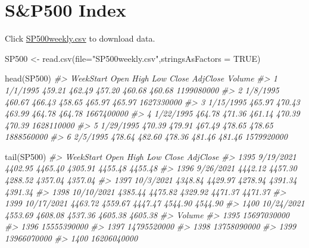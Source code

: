\documentclass[
]{book}
\newenvironment{Shaded}{\begin{snugshade}}{\end{snugshade}}
\newcommand{\AttributeTok}[1]{\textcolor[rgb]{0.77,0.63,0.00}{#1}}
\newcommand{\CommentTok}[1]{\textcolor[rgb]{0.56,0.35,0.01}{\textit{#1}}}
\newcommand{\ConstantTok}[1]{\textcolor[rgb]{0.00,0.00,0.00}{#1}}
\newcommand{\FunctionTok}[1]{\textcolor[rgb]{0.00,0.00,0.00}{#1}}
\newcommand{\NormalTok}[1]{#1}
\newcommand{\OtherTok}[1]{\textcolor[rgb]{0.56,0.35,0.01}{#1}}
\newcommand{\StringTok}[1]{\textcolor[rgb]{0.31,0.60,0.02}{#1}}
\begin{document}
\hypertarget{sp500-index}{%
\section{S\&P500 Index}\label{sp500-index}}

Click \href{http://www.chrisbilder.com/stat878/sections/2/SP500weekly.csv}{SP500weekly.csv} to download data.

\begin{Shaded}
\begin{Highlighting}[]
\NormalTok{SP500 }\OtherTok{\textless{}{-}} \FunctionTok{read.csv}\NormalTok{(}\AttributeTok{file=}\StringTok{"SP500weekly.csv"}\NormalTok{,}\AttributeTok{stringsAsFactors =} \ConstantTok{TRUE}\NormalTok{)}
\end{Highlighting}
\end{Shaded}

\begin{Shaded}
\begin{Highlighting}[]
\FunctionTok{head}\NormalTok{(SP500)}
\CommentTok{\#\textgreater{}   WeekStart   Open   High    Low  Close AdjClose     Volume}
\CommentTok{\#\textgreater{} 1  1/1/1995 459.21 462.49 457.20 460.68   460.68 1199080000}
\CommentTok{\#\textgreater{} 2  1/8/1995 460.67 466.43 458.65 465.97   465.97 1627330000}
\CommentTok{\#\textgreater{} 3 1/15/1995 465.97 470.43 463.99 464.78   464.78 1667400000}
\CommentTok{\#\textgreater{} 4 1/22/1995 464.78 471.36 461.14 470.39   470.39 1628110000}
\CommentTok{\#\textgreater{} 5 1/29/1995 470.39 479.91 467.49 478.65   478.65 1888560000}
\CommentTok{\#\textgreater{} 6  2/5/1995 478.64 482.60 478.36 481.46   481.46 1579920000}
\end{Highlighting}
\end{Shaded}

\begin{Shaded}
\begin{Highlighting}[]
\FunctionTok{tail}\NormalTok{(SP500)}
\CommentTok{\#\textgreater{}       WeekStart    Open    High     Low   Close AdjClose}
\CommentTok{\#\textgreater{} 1395  9/19/2021 4402.95 4465.40 4305.91 4455.48  4455.48}
\CommentTok{\#\textgreater{} 1396  9/26/2021 4442.12 4457.30 4288.52 4357.04  4357.04}
\CommentTok{\#\textgreater{} 1397  10/3/2021 4348.84 4429.97 4278.94 4391.34  4391.34}
\CommentTok{\#\textgreater{} 1398 10/10/2021 4385.44 4475.82 4329.92 4471.37  4471.37}
\CommentTok{\#\textgreater{} 1399 10/17/2021 4463.72 4559.67 4447.47 4544.90  4544.90}
\CommentTok{\#\textgreater{} 1400 10/24/2021 4553.69 4608.08 4537.36 4605.38  4605.38}
\CommentTok{\#\textgreater{}           Volume}
\CommentTok{\#\textgreater{} 1395 15697030000}
\CommentTok{\#\textgreater{} 1396 15555390000}
\CommentTok{\#\textgreater{} 1397 14795520000}
\CommentTok{\#\textgreater{} 1398 13758090000}
\CommentTok{\#\textgreater{} 1399 13966070000}
\CommentTok{\#\textgreater{} 1400 16206040000}
\end{Highlighting}
\end{Shaded}
\end{document}
